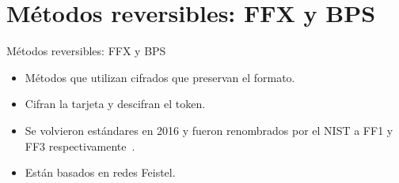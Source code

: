%
%

\section{Métodos reversibles: FFX y BPS}

\begin{frame}{Métodos reversibles: FFX y BPS}

  \begin{itemize}
    \item Métodos que utilizan cifrados que preservan el formato.
    \item Cifran la tarjeta y descifran el token.
    \item Se volvieron estándares en 2016 y fueron renombrados por el NIST
      a FF1 y FF3 respectivamente~\cite{nist_fpe}.
    \item Están basados en redes Feistel.
  \end{itemize}

  \begin{figure}
    \centering
    \\\vspace{0.1in}
  \end{figure}
\end{frame}


